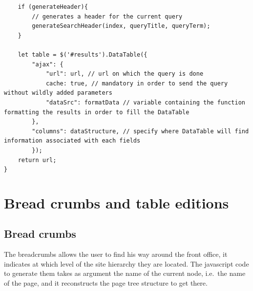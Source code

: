 \documentclass[a4paper,12pt,twoside]{book}
\begin{document}
\begin{lstlisting}
    if (generateHeader){
        // generates a header for the current query
        generateSearchHeader(index, queryTitle, queryTerm);
    }

    let table = $('#results').DataTable({
        "ajax": {
            "url": url, // url on which the query is done
            cache: true, // mandatory in order to send the query without wildly added parameters
            "dataSrc": formatData // variable containing the function formatting the results in order to fill the DataTable
        },
        "columns": dataStructure, // specify where DataTable will find information associated with each fields
        });
    return url;
}
\end{lstlisting}

		\section{Bread crumbs and table editions}\label{bread-crumbs-and-table-editions}

			\subsection{Bread crumbs}\label{bread-crumbs}

The breadcrumbs allows the user to find his way around the front office, it indicates at which level of the site hierarchy they are located. The javascript code to generate them takes as argument the name of the current node, i.e.~the name of the page, and it reconstructs the page tree structure to get there.
\end{document}
